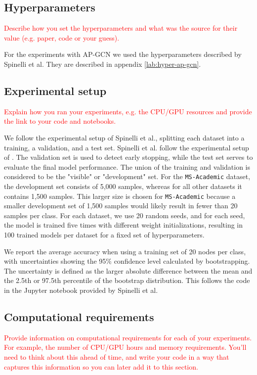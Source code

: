 \documentclass{gdl}
\begin{document}
\subsection{Hyperparameters}
\textcolor{red}{Describe how you set the hyperparameters and what was the source for their value (e.g. paper, code or your guess). }

For the experiments with AP-GCN we used the hyperparameters described by Spinelli et al. They are described in appendix \ref{lab:hyper-ap-gcn}.

\subsection{Experimental setup}
\textcolor{red}{Explain how you ran your experiments, e.g. the CPU/GPU resources and provide the link to your code and notebooks.}

We follow the experimental setup of Spinelli et al., splitting each dataset into a training, a validation, and a test set. Spinelli et al. follow the experimental setup of \cite{}. The validation set is used to detect early stopping, while the test set serves to evaluate the final model performance. The union of the training and validation is considered to be the "visible" or "development" set. For the \texttt{MS-Academic} dataset, the development set consists of 5,000 samples, whereas for all other datasets it contains 1,500 samples. This larger size is chosen for \texttt{MS-Academic} because a smaller development set of 1,500 samples would likely result in fewer than 20 samples per class. For each dataset, we use 20 random seeds, and for each seed, the model is trained five times with different weight initializations, resulting in 100 trained models per dataset for a fixed set of hyperparameters.

We report the average accuracy when using a training set of 20 nodes per class, with uncertainties showing the 95\% confidence level calculated by bootstrapping. The uncertainty is defined as the larger absolute difference between the mean and the 2.5th or 97.5th percentile of the bootstrap distribution. This follows the code in the Jupyter notebook provided by Spinelli et al.

\subsection{Computational requirements}
\textcolor{red}{Provide information on computational requirements for each of your experiments. For example, the number of CPU/GPU hours and memory requirements. You'll need to think about this ahead of time, and write your code in a way that captures this information so you can later add it to this section. }
\end{document}
